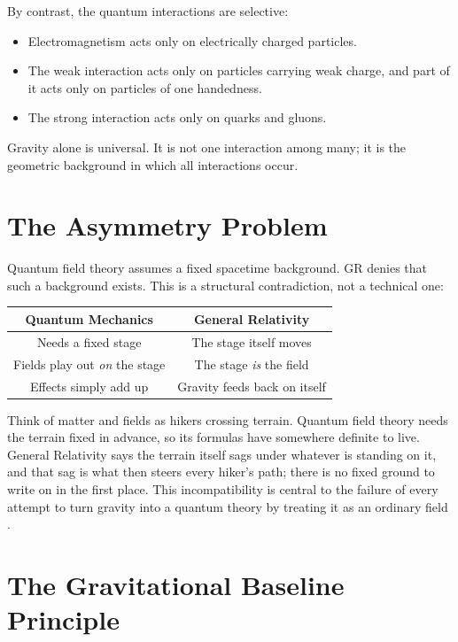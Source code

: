 \documentclass[12pt]{article}
\begin{document}
By contrast, the quantum interactions are selective:
\begin{itemize}
    \item Electromagnetism acts only on electrically charged particles.
    \item The weak interaction acts only on particles carrying weak charge, and part of it acts only on particles of one handedness.
    \item The strong interaction acts only on quarks and gluons.
\end{itemize}

Gravity alone is universal. It is not one interaction among many; it is the geometric background in which all interactions occur.

\section{The Asymmetry Problem}

Quantum field theory assumes a fixed spacetime background. GR denies that such a background exists. This is a structural contradiction, not a technical one:

\begin{center}
\begin{tabular}{|c|c|}
\hline
\textbf{Quantum Mechanics} & \textbf{General Relativity} \\
\hline
Needs a fixed stage & The stage itself moves \\
Fields play out \emph{on} the stage & The stage \emph{is} the field \\
Effects simply add up & Gravity feeds back on itself \\
\hline
\end{tabular}
\end{center}

Think of matter and fields as hikers crossing terrain. Quantum field theory needs the terrain fixed in advance, so its formulas have somewhere definite to live. General Relativity says the terrain itself sags under whatever is standing on it, and that sag is what then steers every hiker's path; there is no fixed ground to write on in the first place. This incompatibility is central to the failure of every attempt to turn gravity into a quantum theory by treating it as an ordinary field \cite{dewitt1967}.

\section{The Gravitational Baseline Principle}
\end{document}
